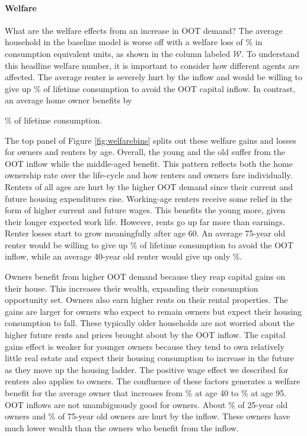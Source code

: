 \documentclass[letterpaper,12pt,dvipsnames,usenames]{article}
\theoremstyle{definition}
\begin{document}
\begin{spacing}{1.25}
 \paragraph{Welfare}
What are the welfare effects from an increase in OOT demand? The average household in the baseline model is worse off  with a welfare loss of \BaselineWelP\% in consumption equivalent units, as shown in the column labeled $\mathcal{W}$. To understand this headline welfare number, it is important to consider how different agents are affected. The average renter is severely hurt by the inflow and would be willing to give up \BaselineWelRP\% of lifetime consumption to avoid the OOT capital inflow. In contrast, an average home owner benefits by {\BaselineWelOP\% of lifetime consumption.

The top panel of Figure \ref{fig:welfarebins} splits out these welfare gains and losses for owners and renters by age. Overall, the young and the old suffer from the OOT inflow while the middle-aged benefit. This pattern reflects both the home ownership rate over the life-cycle and how renters and owners fare individually. Renters of all ages are hurt by the higher OOT demand since their current and future housing expenditures rise. Working-age renters receive some relief in the form of higher current and future wages. This benefits the young more, given their longer expected work life. However,  rents go up far more than earnings. Renter losses start to grow meaningfully after age 60. An average 75-year old renter would be willing to give up {\BaselineAgeSeventyFiveWelR}\% of lifetime consumption to avoid the OOT inflow, while an average 40-year old renter would give up only {\BaselineAgeFourtyWelR}\%.

Owners benefit from higher OOT demand because they reap capital gains on their house. This increases their wealth, expanding their consumption opportunity set. Owners also earn higher rents on their rental properties. The gains are larger for owners who expect to remain owners but expect their housing consumption to fall. These typically older households are not worried about the higher future rents and prices brought about by the OOT inflow. The capital gains effect is weaker for younger owners because they tend to own relatively little real estate and expect their housing consumption to increase in the future as they move up the housing ladder.  The positive wage effect we described for renters also applies to owners. The confluence of these factors generates a welfare benefit for the average owner that increases from {\BaselineAgeFourtyWelO}\% at age 40 to {\BaselineAgeNinetyFiveWelO}\% at age 95.
OOT inflows are not unambiguously good for owners. About \BaselineAgeTwoOwnHurt\% of 25-year old owners and \BaselineAgeForteenOwnHurt\% of 75-year old owners are hurt by the inflow. These owners have much lower wealth than the owners who benefit from the inflow.



}
\end{spacing}
\end{document}
